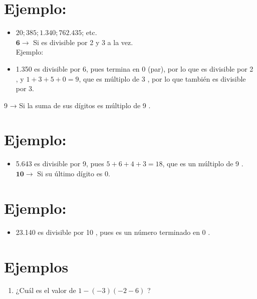 \documentclass[10pt]{article}
\begin{document}
\section*{Ejemplo:}
\begin{itemize}
  \item $20 ; 385 ; 1.340 ; 762.435$; etc.\\
$\mathbf{6} \rightarrow$ Si es divisible por 2 y 3 a la vez.\\
Ejemplo:
  \item 1.350 es divisible por 6, pues termina en 0 (par), por lo que es divisible por 2 , y $1+3+5+0=9$, que es múltiplo de 3 , por lo que también es divisible por 3.
\end{itemize}

9 → Si la suma de sus dígitos es múltiplo de 9 .

\section*{Ejemplo:}
\begin{itemize}
  \item 5.643 es divisible por 9, pues $5+6+4+3=18$, que es un múltiplo de 9 .\\
$\mathbf{1 0} \boldsymbol{\rightarrow}$ Si su último dígito es 0.
\end{itemize}

\section*{Ejemplo:}
\begin{itemize}
  \item 23.140 es divisible por 10 , pues es un número terminado en 0 .
\end{itemize}

\section*{Ejemplos}
\begin{enumerate}
  \item ¿Cuál es el valor de $1-(-3)(-2-6)$ ?
\end{enumerate}
\end{document}
